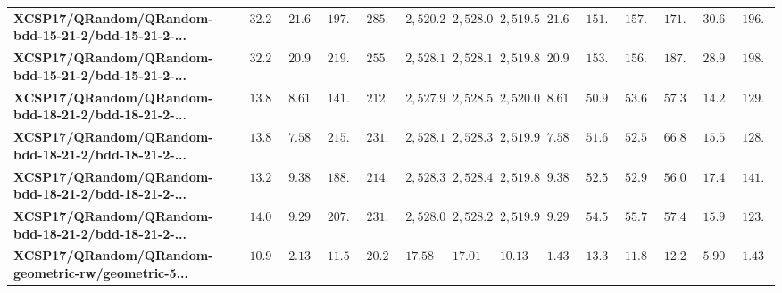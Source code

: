 \begin{tabular}{llllllllllllll}
\textbf{XCSP17/QRandom/QRandom-bdd-15-21-2/bdd-15-21-2-...} &         $32.2367$ &    $21.6676$ &     $197.271$ &       $285.739$ &                                 $2,520.29$ &                              $2,528.07$ &          $2,519.56$ &   $21.6676$ &                $151.83$ &               $157.393$ &               $171.338$ &               $30.6837$ &   $196.113$ \\
\textbf{XCSP17/QRandom/QRandom-bdd-15-21-2/bdd-15-21-2-...} &         $32.2592$ &    $20.9563$ &     $219.608$ &       $255.008$ &                                 $2,528.19$ &                               $2,528.1$ &          $2,519.84$ &   $20.9563$ &               $153.294$ &                $156.11$ &                $187.24$ &               $28.9632$ &   $198.924$ \\
\textbf{XCSP17/QRandom/QRandom-bdd-18-21-2/bdd-18-21-2-...} &         $13.8464$ &    $8.61259$ &     $141.541$ &       $212.271$ &                                 $2,527.99$ &                              $2,528.55$ &          $2,520.05$ &   $8.61259$ &               $50.9272$ &               $53.6276$ &               $57.3727$ &               $14.2905$ &   $129.348$ \\
\textbf{XCSP17/QRandom/QRandom-bdd-18-21-2/bdd-18-21-2-...} &         $13.8552$ &    $7.58339$ &      $215.94$ &       $231.426$ &                                 $2,528.19$ &                              $2,528.31$ &           $2,519.9$ &   $7.58339$ &               $51.6042$ &               $52.5723$ &               $66.8782$ &                $15.598$ &   $128.685$ \\
\textbf{XCSP17/QRandom/QRandom-bdd-18-21-2/bdd-18-21-2-...} &         $13.2742$ &    $9.38861$ &     $188.316$ &       $214.292$ &                                 $2,528.32$ &                              $2,528.43$ &          $2,519.87$ &   $9.38861$ &               $52.5511$ &               $52.9257$ &               $56.0701$ &               $17.4375$ &   $141.896$ \\
\textbf{XCSP17/QRandom/QRandom-bdd-18-21-2/bdd-18-21-2-...} &          $14.048$ &    $9.29758$ &     $207.518$ &       $231.575$ &                                 $2,528.08$ &                              $2,528.25$ &          $2,519.94$ &   $9.29758$ &                $54.519$ &               $55.7126$ &               $57.4199$ &               $15.9223$ &   $123.701$ \\
\textbf{XCSP17/QRandom/QRandom-geometric-rw/geometric-5...} &          $10.962$ &    $2.13684$ &     $11.5672$ &       $20.2391$ &                                  $17.5823$ &                               $17.0131$ &           $10.1354$ &   $1.43496$ &               $13.3125$ &               $11.8642$ &               $12.2555$ &               $5.90029$ &   $1.43496$ \\

\end{tabular}
